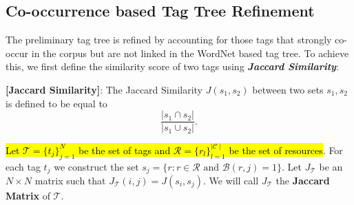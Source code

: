 \subsection{Co-occurrence based Tag Tree Refinement}
\label{sec:refinement}
The preliminary tag tree is refined by accounting for those tags that strongly co-occur in the corpus but are not linked in the WordNet based tag tree. To achieve this, we first define the similarity score of two tags using {\bf {\em Jaccard Similarity}}:
\begin{definition}
{\bf [Jaccard Similarity]}: The Jaccard Similarity $J(s_1, s_2)$ between two sets $s_1, s_2$ is defined to be equal to
\begin{equation} 
\frac{|s_1 \cap s_2|}{|s_1 \cup s_2|}.
\label{eq:jaccard}
\end{equation}
\end{definition}

\hl{Let $\mathcal{T}=\{t_j\}_{j=1}^N$ be the set of tags and $\mathcal{R} = \{r_l\}_{l=1}^{\mid\mathscr{C}\mid}$ be the set of resources}. For each tag $t_j$ we construct the set $s_j = \{ r : r \in \mathcal{R} \mbox{ and } \mathcal{B}(r,j)=1 \}$. Let $J_{\mathcal{T}}$ be an $N \times N$ matrix such that $J_{\mathcal{T}}(i,j) = J(s_i, s_j)$. We will call $J_{\mathcal{T}}$ the {\bf Jaccard Matrix} of $\mathcal{T}$.


